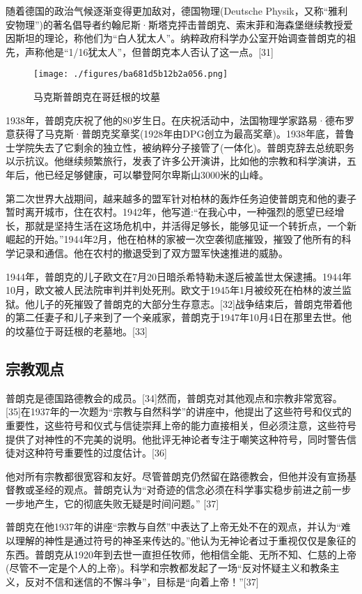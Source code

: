 随着德国的政治气候逐渐变得更加敌对，德国物理(Deutsche Physik，又称“雅利安物理”)的著名倡导者约翰尼斯·斯塔克抨击普朗克、索末菲和海森堡继续教授爱因斯坦的理论，称他们为“白人犹太人”。纳粹政府科学办公室开始调查普朗克的祖先，声称他是“1/16犹太人”，但普朗克本人否认了这一点。[31]
\begin{figure}[ht]
\centering
\texttt{[image: ./figures/ba681d5b12b2a056.png]}
\caption{马克斯普朗克在哥廷根的坟墓} \label{fig_Max_6}
\end{figure}
1938年，普朗克庆祝了他的80岁生日。在庆祝活动中，法国物理学家路易·德布罗意获得了马克斯·普朗克奖章奖(1928年由DPG创立为最高奖章)。1938年底，普鲁士学院失去了它剩余的独立性，被纳粹分子接管了(一体化)。普朗克辞去总统职务以示抗议。他继续频繁旅行，发表了许多公开演讲，比如他的宗教和科学演讲，五年后，他已经足够健康，可以攀登阿尔卑斯山3000米的山峰。

第二次世界大战期间，越来越多的盟军针对柏林的轰炸任务迫使普朗克和他的妻子暂时离开城市，住在农村。1942年，他写道:“在我心中，一种强烈的愿望已经增长，那就是坚持生活在这场危机中，并活得足够长，能够见证一个转折点，一个新崛起的开始。”1944年2月，他在柏林的家被一次空袭彻底摧毁，摧毁了他所有的科学记录和通信。他在农村的撤退受到了双方盟军快速推进的威胁。

1944年，普朗克的儿子欧文在7月20日暗杀希特勒未遂后被盖世太保逮捕。1944年10月，欧文被人民法院审判并判处死刑。欧文于1945年1月被绞死在柏林的波兰监狱。他儿子的死摧毁了普朗克的大部分生存意志。[32]战争结束后，普朗克带着他的第二任妻子和儿子来到了一个亲戚家，普朗克于1947年10月4日在那里去世。他的坟墓位于哥廷根的老墓地。[33]

\subsection{宗教观点}
普朗克是德国路德教会的成员。[34]然而，普朗克对其他观点和宗教非常宽容。[35]在1937年的一次题为“宗教与自然科学”的讲座中，他提出了这些符号和仪式的重要性，这些符号和仪式与信徒崇拜上帝的能力直接相关，但必须注意，这些符号提供了对神性的不完美的说明。他批评无神论者专注于嘲笑这种符号，同时警告信徒对这种符号重要性的过度估计。[36]

他对所有宗教都很宽容和友好。尽管普朗克仍然留在路德教会，但他并没有宣扬基督教或圣经的观点。普朗克认为“对奇迹的信念必须在科学事实稳步前进之前一步一步地产生，它的彻底失败无疑是时间问题。” [37]

普朗克在他1937年的讲座“宗教与自然”中表达了上帝无处不在的观点，并认为“难以理解的神性是通过符号的神圣来传达的。”他认为无神论者过于重视仅仅是象征的东西。普朗克从1920年到去世一直担任牧师，他相信全能、无所不知、仁慈的上帝(尽管不一定是个人的上帝)。科学和宗教都发起了一场“反对怀疑主义和教条主义，反对不信和迷信的不懈斗争”，目标是“向着上帝！”[37]

